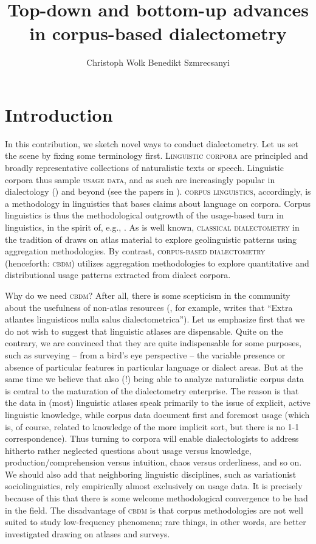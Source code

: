 \documentclass[output=paper]{LSP/langsci}
\author{Christoph Wolk\affiliation{University of Giessen} \lastand Benedikt Szmrecsanyi\affiliation{KU Leuven}}
\title{Top-down and bottom-up advances in corpus-based dialectometry}
\begin{document}
  

\section{Introduction}

In this contribution, we sketch novel ways to conduct dialectometry. Let us set the scene by fixing some terminology first. \textsc{Linguistic corpora} are principled and broadly representative collections of naturalistic texts or speech. Linguistic corpora thus sample \textsc{usage data}, and as such are increasingly popular in dialectology (\citealt{anderwald_corpus_2009,grieve_corpus-based_2009}) and beyond (see the papers in \citealt{szmrecsanyi_aggregating_2014}). \textsc{corpus linguistics}, accordingly, is a methodology in linguistics that bases claims about language on corpora. Corpus linguistics is thus the methodological outgrowth of the usage-based turn in linguistics, in the spirit of, e.g.,  \citet{bybee_language_2010,tomasello_constructing_2003}. As is well known, \textsc{classical dialectometry} in the tradition of \citet{goebl_dialektometrische_1984,nerbonne_edit_1999} draws on atlas material to explore geolinguistic patterns using aggregation methodologies. By contrast, \textsc{corpus-based dialectometry} (henceforth: \textsc{cbdm}) utilizes aggregation methodologies to explore quantitative and distributional usage patterns extracted from dialect corpora.

Why do we need \textsc{cbdm}? 
After all, there is some scepticism in the community about the usefulness of non-atlas resources (\citealt[499]{goebl_dialektometrie_2005}, for example, writes that ``Extra atlantes linguisticos nulla salus dialectometrica'').
Let us emphasize first that we do not wish to suggest that linguistic atlases are dispensable. 
Quite on the contrary, we are convinced that they are quite indispensable for some purposes, such as surveying -- from a bird's eye perspective -- the variable presence or absence of particular features in particular language or dialect areas.
But at the same time we believe that also (!) being able to analyze naturalistic corpus data is central to the maturation of the dialectometry enterprise.
The reason is that the data in (most) linguistic atlases speak primarily to the issue of explicit, active linguistic knowledge, while corpus data document first and foremost usage (which is, of course, related to knowledge of the more implicit sort, but there is no 1-1 correspondence).
Thus turning to corpora will enable dialectologists to address hitherto rather neglected questions about usage versus knowledge,  production/comprehension versus intuition, chaos versus orderliness, and so on. 
We should also add that neighboring linguistic disciplines, such as variationist sociolinguistics, rely empirically almost exclusively on usage data. 
It is precisely because of this that there is some welcome methodological convergence to be had in the field. 
The disadvantage of \textsc{cbdm} is that corpus methodologies are not well suited to study low-frequency phenomena; rare things, in other words, are better investigated drawing on atlases and surveys.
\end{document}
